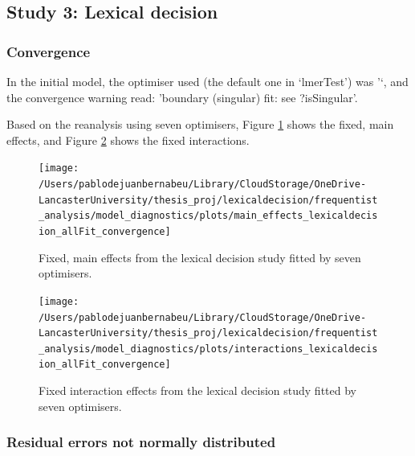 \documentclass[
  12pt,
  man,floatsintext]{apa7}
\begin{document}
\hypertarget{study-3-lexical-decision-1}{%
\subsection{Study 3: Lexical decision}\label{study-3-lexical-decision-1}}

\hypertarget{convergence-5}{%
\subsubsection{Convergence}\label{convergence-5}}

In the initial model, the optimiser used (the default one in `lmerTest') was '`, and the convergence warning read: 'boundary (singular) fit: see ?isSingular'.

Based on the reanalysis using seven optimisers, Figure \ref{fig:main-effects-lexicaldecision-allFit-convergence} shows the fixed, main effects, and Figure \ref{fig:interactions-lexicaldecision-allFit-convergence} shows the fixed interactions.

\begin{figure}

{\centering \texttt{[image: /Users/pablodejuanbernabeu/Library/CloudStorage/OneDrive-LancasterUniversity/thesis\_proj/lexicaldecision/frequentist\_analysis/model\_diagnostics/plots/main\_effects\_lexicaldecision\_allFit\_convergence]} 

}

\caption{Fixed, main effects from the lexical decision study fitted by seven optimisers.}\label{fig:main-effects-lexicaldecision-allFit-convergence}
\end{figure}

\begin{figure}

{\centering \texttt{[image: /Users/pablodejuanbernabeu/Library/CloudStorage/OneDrive-LancasterUniversity/thesis\_proj/lexicaldecision/frequentist\_analysis/model\_diagnostics/plots/interactions\_lexicaldecision\_allFit\_convergence]} 

}

\caption{Fixed interaction effects from the lexical decision study fitted by seven optimisers.}\label{fig:interactions-lexicaldecision-allFit-convergence}
\end{figure}

\hypertarget{residual-errors-not-normally-distributed-4}{%
\subsubsection{Residual errors not normally distributed}\label{residual-errors-not-normally-distributed-4}}
\end{document}
